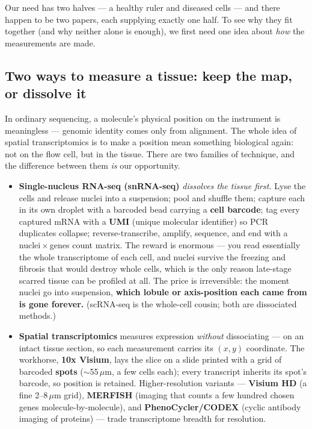 \documentclass[11pt]{article}
\begin{document}
Our need has two halves --- a healthy ruler and diseased cells --- and there happen to be two papers,
each supplying exactly one half. To see why they fit together (and why neither alone is enough), we
first need one idea about \emph{how} the measurements are made.

\subsection{Two ways to measure a tissue: keep the map, or dissolve it}

In ordinary sequencing, a molecule's physical position on the instrument is meaningless --- genomic
identity comes only from alignment. The whole idea of spatial transcriptomics is to make a position
mean something biological again: not on the flow cell, but in the tissue. There are two families of
technique, and the difference between them \emph{is} our opportunity.

\begin{itemize}[leftmargin=1.4em]
\item \textbf{Single-nucleus RNA-seq (snRNA-seq)} \emph{dissolves the tissue first.} Lyse the cells and
release nuclei into a suspension; pool and shuffle them; capture each in its own droplet with a
barcoded bead carrying a \textbf{cell barcode}; tag every captured mRNA with a \textbf{UMI} (unique
molecular identifier) so PCR duplicates collapse; reverse-transcribe, amplify, sequence, and end with a
nuclei\,$\times$\,genes count matrix. The reward is enormous --- you read essentially the whole
transcriptome of each cell, and nuclei survive the freezing and fibrosis that would destroy whole
cells, which is the only reason late-stage scarred tissue can be profiled at all. The price is
irreversible: the moment nuclei go into suspension, \textbf{which lobule or axis-position each came from
is gone forever.} (scRNA-seq is the whole-cell cousin; both are dissociated methods.)
\item \textbf{Spatial transcriptomics} measures expression \emph{without} dissociating --- on an
intact tissue section, so each measurement carries its $(x,y)$ coordinate. The workhorse, \textbf{10x
Visium}, lays the slice on a slide printed with a grid of barcoded \textbf{spots} ($\sim$55\,$\mu$m, a
few cells each); every transcript inherits its spot's barcode, so position is retained. Higher-resolution
variants --- \textbf{Visium HD} (a fine 2--8\,$\mu$m grid), \textbf{MERFISH} (imaging that counts a few
hundred chosen genes molecule-by-molecule), and \textbf{PhenoCycler/CODEX} (cyclic antibody imaging of
proteins) --- trade transcriptome breadth for resolution.
\end{itemize}
\end{document}
